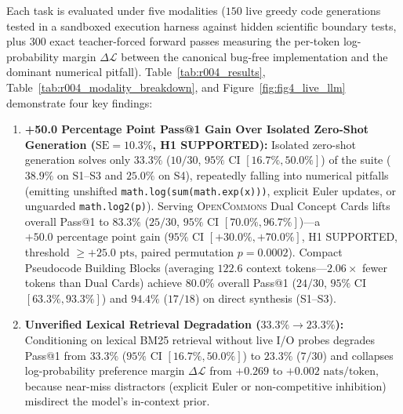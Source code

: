 \documentclass[10pt,twocolumn]{article}
\begin{document}
Each task is evaluated under five modalities ($150$ live greedy code generations tested in a sandboxed execution harness against hidden scientific boundary tests, plus $300$ exact teacher-forced forward passes measuring the per-token log-probability margin $\Delta \mathcal{L}$ between the canonical bug-free implementation and the dominant numerical pitfall). Table~\ref{tab:r004_results}, Table~\ref{tab:r004_modality_breakdown}, and Figure~\ref{fig:fig4_live_llm} demonstrate four key findings:
\begin{enumerate}
    \item \textbf{+50.0 Percentage Point Pass@1 Gain Over Isolated Zero-Shot Generation ($\text{SE} = 10.3\%$, H1 SUPPORTED):} Isolated zero-shot generation solves only $33.3\%$ ($10/30$, $95\%$ CI $[16.7\%, 50.0\%]$) of the suite ($38.9\%$ on S1--S3 and $25.0\%$ on S4), repeatedly falling into numerical pitfalls (emitting unshifted \texttt{math.log(sum(math.exp(x)))}, explicit Euler updates, or unguarded \texttt{math.log2(p)}). Serving \textsc{OpenCommons} Dual Concept Cards lifts overall Pass@1 to $83.3\%$ ($25/30$, $95\%$ CI $[70.0\%, 96.7\%]$)—a $+50.0\text{ percentage point}$ gain ($95\%$ CI $[+30.0\%, +70.0\%]$, H1 SUPPORTED, threshold $\ge +25.0\text{ pts}$, paired permutation $p = 0.0002$). Compact Pseudocode Building Blocks (averaging $122.6$ context tokens—$2.06\times$ fewer tokens than Dual Cards) achieve $80.0\%$ overall Pass@1 ($24/30$, $95\%$ CI $[63.3\%, 93.3\%]$) and $94.4\%$ ($17/18$) on direct synthesis (S1--S3).
    \item \textbf{Unverified Lexical Retrieval Degradation ($33.3\% \to 23.3\%$):} Conditioning on lexical BM25 retrieval without live I/O probes degrades Pass@1 from $33.3\%$ ($95\%$ CI $[16.7\%, 50.0\%]$) to $23.3\%$ ($7/30$) and collapses log-probability preference margin $\Delta \mathcal{L}$ from $+0.269$ to $+0.002\text{ nats/token}$, because near-miss distractors (explicit Euler or non-competitive inhibition) misdirect the model's in-context prior.

\end{enumerate}
\end{document}
